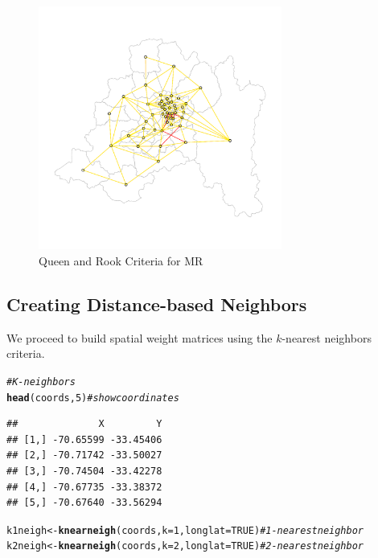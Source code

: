 \documentclass[english,12pt]{book}\usepackage[]{graphicx}\usepackage[]{xcolor}
\makeatletter
\newcommand{\hlnum}[1]{\textcolor[rgb]{0.686,0.059,0.569}{#1}}%
\newcommand{\hlcom}[1]{\textcolor[rgb]{0.678,0.584,0.686}{\textit{#1}}}%
\newcommand{\hldef}[1]{\textcolor[rgb]{0.345,0.345,0.345}{#1}}%
\newcommand{\hlkwb}[1]{\textcolor[rgb]{0.69,0.353,0.396}{#1}}%
\newcommand{\hlkwc}[1]{\textcolor[rgb]{0.333,0.667,0.333}{#1}}%
\newcommand{\hlkwd}[1]{\textcolor[rgb]{0.737,0.353,0.396}{\textbf{#1}}}%
\newenvironment{kframe}{%
 \def\at@end@of@kframe{}%
 \ifinner\ifhmode%
  \def\at@end@of@kframe{\end{minipage}}%
  \begin{minipage}{\columnwidth}%
 \fi\fi%
 \def\FrameCommand##1{\hskip\@totalleftmargin \hskip-\fboxsep
 \colorbox{shadecolor}{##1}\hskip-\fboxsep
     \hskip-\linewidth \hskip-\@totalleftmargin \hskip\columnwidth}%
 \MakeFramed {\advance\hsize-\width
   \@totalleftmargin\z@ \linewidth\hsize
   \@setminipage}}%
 {\par\unskip\endMakeFramed%
 \at@end@of@kframe}
\newenvironment{knitrout}{}{} %
\makeatother
\begin{document}
\begin{figure}[ht]
  \caption{Queen and Rook Criteria for MR}
    \label{fig:Queen-Rook}
\begin{knitrout}
\color{fgcolor}

{\centering \includegraphics[width=8cm,height=8cm]{figure/plot-queen-rookT-1} 

}


\end{knitrout}
\end{figure}

\subsection{Creating Distance-based Neighbors}

We proceed to build spatial weight matrices using the $k$-nearest neighbors criteria. 

\begin{knitrout}
\color{fgcolor}\begin{kframe}
\begin{alltt}
\hlcom{# K-neighbors}
\hlkwd{head}\hldef{(coords,} \hlnum{5}\hldef{)}                                       \hlcom{# show coordinates}
\end{alltt}
\begin{verbatim}
##              X         Y
## [1,] -70.65599 -33.45406
## [2,] -70.71742 -33.50027
## [3,] -70.74504 -33.42278
## [4,] -70.67735 -33.38372
## [5,] -70.67640 -33.56294
\end{verbatim}
\begin{alltt}
\hldef{k1neigh} \hlkwb{<-} \hlkwd{knearneigh}\hldef{(coords,} \hlkwc{k} \hldef{=} \hlnum{1}\hldef{,} \hlkwc{longlat} \hldef{=} \hlnum{TRUE}\hldef{)}  \hlcom{# 1-nearest neighbor}
\hldef{k2neigh} \hlkwb{<-} \hlkwd{knearneigh}\hldef{(coords,} \hlkwc{k} \hldef{=} \hlnum{2}\hldef{,} \hlkwc{longlat} \hldef{=} \hlnum{TRUE}\hldef{)}  \hlcom{# 2-nearest neighbor}
\end{alltt}
\end{kframe}
\end{knitrout}
\end{document}

